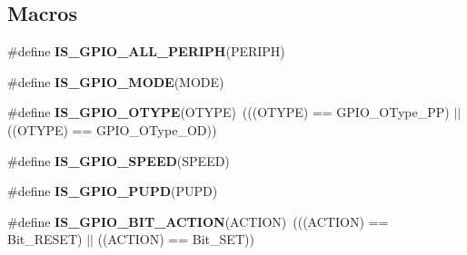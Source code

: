 \subsection*{Macros}
\begin{DoxyCompactItemize}
\item 
\#define {\bfseries I\+S\+\_\+\+G\+P\+I\+O\+\_\+\+A\+L\+L\+\_\+\+P\+E\+R\+I\+PH}(P\+E\+R\+I\+PH)
\item 
\#define {\bfseries I\+S\+\_\+\+G\+P\+I\+O\+\_\+\+M\+O\+DE}(M\+O\+DE)
\item 
\mbox{\label{group___g_p_i_o_ga7145550a414f2b0455d79ddde6100af8}} 
\#define {\bfseries I\+S\+\_\+\+G\+P\+I\+O\+\_\+\+O\+T\+Y\+PE}(O\+T\+Y\+PE)~(((O\+T\+Y\+PE) == G\+P\+I\+O\+\_\+\+O\+Type\+\_\+\+PP) $\vert$$\vert$ ((O\+T\+Y\+PE) == G\+P\+I\+O\+\_\+\+O\+Type\+\_\+\+OD))
\item 
\#define {\bfseries I\+S\+\_\+\+G\+P\+I\+O\+\_\+\+S\+P\+E\+ED}(S\+P\+E\+ED)
\item 
\#define {\bfseries I\+S\+\_\+\+G\+P\+I\+O\+\_\+\+P\+U\+PD}(P\+U\+PD)
\item 
\mbox{\label{group___g_p_i_o_ga6b882caa8ed9857c5c7267959a7818c5}} 
\#define {\bfseries I\+S\+\_\+\+G\+P\+I\+O\+\_\+\+B\+I\+T\+\_\+\+A\+C\+T\+I\+ON}(A\+C\+T\+I\+ON)~(((A\+C\+T\+I\+ON) == Bit\+\_\+\+R\+E\+S\+ET) $\vert$$\vert$ ((A\+C\+T\+I\+ON) == Bit\+\_\+\+S\+ET))
\end{DoxyCompactItemize}
